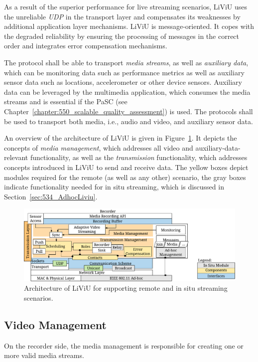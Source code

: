 As a result of the superior performance for live streaming scenarios, \ac{LiViU} uses the unreliable \emph{\ac{UDP}} in the transport layer and compensates its weaknesses by additional application layer mechanisms.
\ac{LiViU} is message-oriented.
It copes with the degraded reliability by ensuring the processing of messages in the correct order and integrates error compensation mechanisms.

The protocol shall be able to transport \emph{media streams}, as well as \emph{auxiliary data}, which can be monitoring data such as performance metrics as well as auxiliary sensor data such as locations, accelerometer or other device sensors.
Auxiliary data can be leveraged by the multimedia application, which consumes the media streams and is essential if the \ac{PaSC} (see Chapter~\ref{chapter:550_scalable_quality_assessment}) is used.
The protocols shall be used to transport both media, i.e., audio and video, and auxiliary sensor data.

An overview of the architecture of \ac{LiViU} is given in Figure~\ref{fig:522_architectureliviu}.
It depicts the concepts of \emph{media management}, which addresses all video and auxiliary-data-relevant functionality, as well as the \emph{transmission} functionality, which addresses concepts introduced in \ac{LiViU} to send and receive data.
The yellow boxes depict modules required for the remote (as well as any other) scenario, the gray boxes indicate functionality needed for in situ streaming, which is discussed in Section~\ref{sec:534_AdhocLiviu}.
\begin{figure}[tbh]
\centering
\includegraphics[width=\linewidth]{gfx/500_MobileUpload/architecture_liviu}
\caption[Architecture of \acf{LiViU}]{Architecture of LiViU for supporting remote and in situ streaming scenarios.}
\label{fig:522_architectureliviu}
\end{figure}

\subsection{Video Management}
On the recorder side, the media management is responsible for creating one or more valid media streams.

